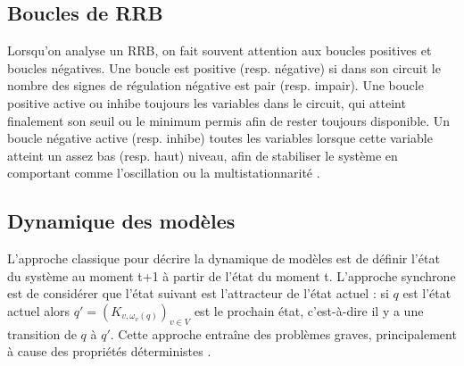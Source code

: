 \documentclass[11pt]{report}
\theoremstyle{definition}
\begin{document}
\subsection{Boucles de RRB}
Lorsqu'on analyse un RRB, on fait souvent attention aux boucles positives et boucles n\'egatives. Une boucle est positive (resp. n\'egative) si dans son circuit le nombre des signes de r\'egulation n\'egative est pair (resp. impair). Une boucle positive active ou inhibe toujours les variables dans le circuit, qui atteint finalement son seuil ou le minimum permis afin de rester toujours disponible. Un boucle n\'egative active (resp. inhibe) toutes les variables lorsque cette variable atteint un assez bas (resp. haut) niveau, afin de stabiliser le syst\`eme en comportant comme l'oscillation ou la multistationnarit\'e \citep{Thomas1978}.
\subsection{Dynamique des mod\`eles}
L'approche classique pour d\'ecrire la dynamique de mod\`eles est de d\'efinir l'\'etat du syst\`eme au moment t+1 \`a partir de l'\'etat du moment t. L'approche synchrone est de consid\'erer que l'\'etat suivant est l'attracteur de l'\'etat actuel : si $q$ est l'\'etat actuel alors $q'=(K_{v,\omega_v(q)})_{v\in V}$ est le prochain \'etat, c'est-\`a-dire il y a une transition de $q$ \`a $q'$. Cette approche entra\^ine des probl\`emes graves, principalement \`a cause des propri\'et\'es d\'eterministes \citep{Richard2006}.
\end{document}
